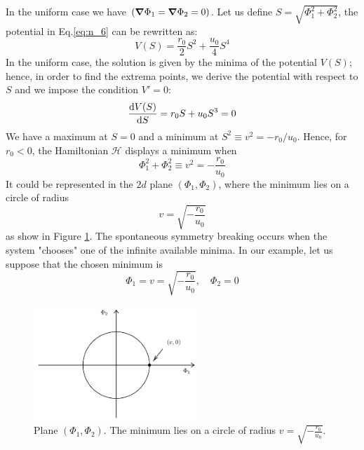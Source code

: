 \documentclass[../../Main/Main.tex]{subfiles}
\begin{document}
In the uniform case we have \( (\grad \Phi _1 = \grad \Phi _2 = 0) \). Let us define
\( S = \sqrt{\Phi _1^2 + \Phi _2^2}  \), the potential in Eq.\eqref{eq:n_6} can be rewritten as:
\begin{equation*}
  V (S) = \frac{r_0}{2} S^2 + \frac{u_0}{4} S^4
\end{equation*}
In the uniform case, the solution is given by the minima of the potential \( V(S) \); hence, in order to find the extrema points, we derive the potential with respect to \( S \) and we impose the condition \( V'=0 \):
\begin{equation*}
  \dv{V(S)}{S} = r_0 S + u_0 S^3 = 0
\end{equation*}
We have a maximum at \( S=0 \) and a minimum at  \( S^2 \equiv v^2 = -  r_0/u_0 \). Hence, for \( r_0 < 0 \), the Hamiltonian \( \mathcal{H} \) displays a minimum when
\begin{equation*}
  \Phi _1^2 + \Phi _2^2 \equiv v^2 = - \frac{r_0}{u_0}
\end{equation*}
It could be represented in the \( 2d \) plane \( (\Phi _1, \Phi _2) \), where the minimum lies on a circle of radius
\begin{equation*}
  v = \sqrt{- \frac{r_0}{u_0}}
\end{equation*}
as show in Figure \ref{fig:n_4}.
The spontaneous symmetry breaking occurs when the system "chooses" one of the infinite available minima.
In our example, let us suppose that the chosen minimum is
\begin{equation}
  \Phi _1 = v = \sqrt{- \frac{r_0}{u_0}}, \quad \Phi _2 = 0
  \label{eq:n_7}
\end{equation}

\begin{figure}[H]
\centering
\includegraphics[width=0.55\textwidth]{./img/4.pdf}
\caption{\label{fig:n_4} Plane \( (\Phi _1, \Phi _2) \). The minimum lies on a circle of radius \( v = \sqrt{- \frac{r_0}{u_0}} \). }
\end{figure}
\end{document}
